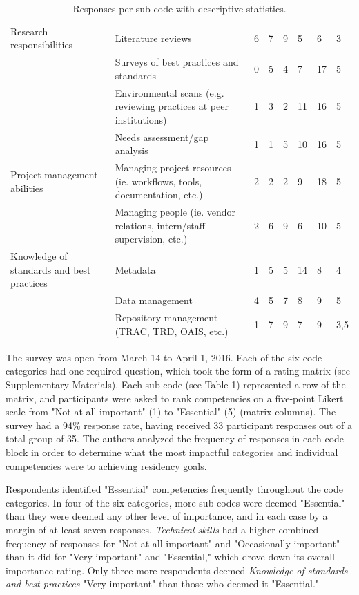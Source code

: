 \documentclass{acm_proc_article-sp}
\begin{document}
\begin{table}[t!]
{\begin{tabular}{llllllll}
Research responsibilities & Literature reviews & 6 & 7 & 9 & 5 & 6 & 3 \\
 & Surveys of best practices and standards & 0 & 5 & 4 & 7 & 17 & 5 \\
 & Environmental scans (e.g. reviewing practices at peer institutions) & 1 & 3 & 2 & 11 & 16 & 5 \\
 & Needs assessment/gap analysis & 1 & 1 & 5 & 10 & 16 & 5 \\
Project management abilities & Managing project resources (ie. workflows, tools, documentation, etc.) & 2 & 2 & 2 & 9 & 18 & 5 \\
 & Managing people (ie. vendor relations, intern/staff supervision, etc.) & 2 & 6 & 9 & 6 & 10 & 5 \\
Knowledge of standards and best practices & Metadata & 1 & 5 & 5 & 14 & 8 & 4 \\
 & Data management & 4 & 5 & 7 & 8 & 9 & 5 \\
 & Repository management (TRAC, TRD, OAIS, etc.) & 1 & 7 & 9 & 7 & 9 & 3,5
\end{tabular}%
}
\caption{Responses per sub-code with descriptive statistics.}
\label{my-label}
\end{table}
The survey was open from March 14 to April 1, 2016. Each of the six code categories had one required question, which took the form of a rating matrix (see Supplementary Materials). Each sub-code (see Table 1) represented a row of the matrix, and participants were asked to rank competencies on a five-point Likert scale from "Not at all important" (1) to "Essential" (5) (matrix columns). The survey had a 94\% response rate, having received 33 participant responses out of a total group of 35. The authors analyzed the frequency of responses in each code block in order to determine what the most impactful categories and individual competencies were to achieving residency goals.  

Respondents identified "Essential" competencies frequently throughout the code categories. In four of the six categories, more sub-codes were deemed "Essential" than they were deemed any other level of importance, and in each case by a margin of at least seven responses. \textit{Technical skills} had a higher combined frequency of responses for "Not at all important" and "Occasionally important" than it did for "Very important" and "Essential," which drove down its overall importance rating. Only three more respondents deemed \textit{Knowledge of standards and best practices} "Very important" than those who deemed it "Essential."
\end{document}
